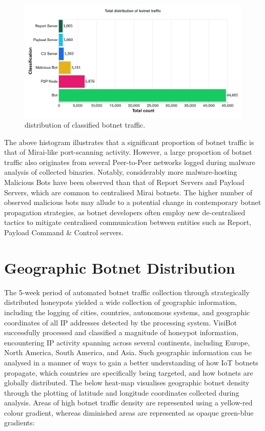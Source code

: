 \begin{figure}[!htb]
    \centering
    \includegraphics[width=0.85\linewidth]{results/botnet_distribution_histogram.png}
    \caption{distribution of classified botnet traffic.}
    \label{fig:botnet_distribution} 
\end{figure}

\newpage

The above histogram illustrates that a significant proportion of botnet traffic is that of Mirai-like port-scanning activity. However, a large proportion of botnet traffic also originates from several Peer-to-Peer networks logged during malware analysis of collected binaries. Notably, considerably more malware-hosting Malicious Bots have been observed than that of Report Servers and Payload Servers, which are common to centralised Mirai botnets. The higher number of observed malicious bots may allude to a potential change in contemporary botnet propagation strategies, as botnet developers often employ new de-centralised tactics to mitigate centralised communication between entities such as Report, Payload Command \& Control servers.

\section{Geographic Botnet Distribution}

The 5-week period of automated botnet traffic collection through strategically distributed honeypots yielded a wide collection of geographic information, including the logging of cities, countries, autonomous systems, and geographic coordinates of all IP addresses detected by the processing system. VisiBot successfully processed and classified a magnitude of honeypot information, encountering IP activity spanning across several continents, including Europe, North America, South America, and Asia. Such geographic information can be analysed in a manner of ways to gain a better understanding of how IoT botnets propagate, which countries are specifically being targeted, and how botnets are globally distributed. The below heat-map visualises geographic botnet density through the plotting of latitude and longitude coordinates collected during analysis. Areas of high botnet traffic density are represented using a yellow-red colour gradient, whereas diminished areas are represented as opaque green-blue gradients:

